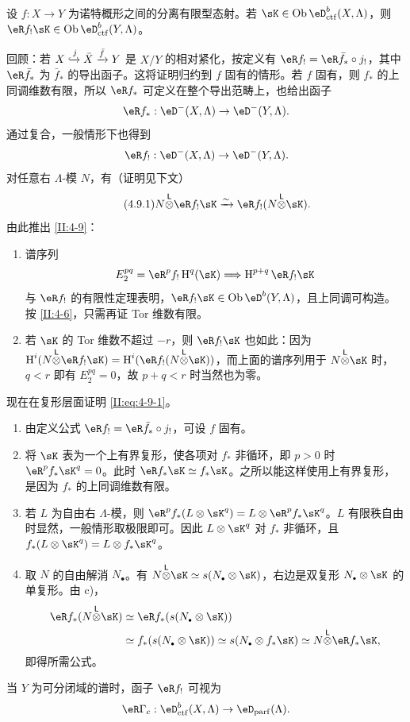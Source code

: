 \begin{theorem_}\label{II:4-9}
设 $f:X\to Y$ 为诺特概形之间的分离有限型态射。若 $\sK\in\ob\eD_{\mathrm{ctf}}^b(X,\Lambda)$，则 $\eR f_!\sK\in\ob\eD_{\mathrm{ctf}}^b(Y,\Lambda)$。
\end{theorem_}
回顾：若 $X\xhookrightarrow{j}\bar X\xrightarrow{\bar f}Y$ 是 $X/Y$ 的相对紧化，按定义有 $\eR f_!=\eR\bar f_*\circ j_!$，其中 $\eR\bar f_*$ 为 $\bar f_*$ 的导出函子。这将证明归约到 $f$ 固有的情形。若 $f$ 固有，则 $f_*$ 的上同调维数有限，所以 $\eR f_*$ 可定义在整个导出范畴上，也给出函子
\[\eR f_*:\eD^-(X,\Lambda)\to\eD^-(Y,\Lambda).\]
通过复合，一般情形下也得到
\[\eR f_!:\eD^-(X,\Lambda)\to\eD^-(Y,\Lambda).\]
对任意右 $\Lambda$-模 $N$，有（证明见下文）
\begin{equation*}\tag{4.9.1}\label{II:eq:4-9-1}
N\lotimes\eR f_!\sK\iso\eR f_!(N\lotimes\sK).
\end{equation*}
由此推出 \ref{II:4-9}：
\begin{enumerate}[\indent a)]
\item 谱序列
\[E_2^{pq}=\eR^pf_!\h^q(\sK)\Longrightarrow\h^{p+q}\eR f_!\sK\]
与 $\eR f_!$ 的有限性定理表明，$\eR f_!\sK\in\ob\eD^b(Y,\Lambda)$，且上同调可构造。按 \ref{II:4-6}，只需再证 Tor 维数有限。
\item 若 $\sK$ 的 Tor 维数不超过 $-r$，则 $\eR f_!\sK$ 也如此：因为 $\h^i(N\lotimes\eR f_!\sK)=\h^i(\eR f_!(N\lotimes\sK))$，而上面的谱序列用于 $N\lotimes\sK$ 时，$q<r$ 即有 $E_2^{pq}=0$，故 $p+q<r$ 时当然也为零。
\end{enumerate}
现在在复形层面证明 \eqref{II:eq:4-9-1}。
\begin{enumerate}[\indent a)]
\item 由定义公式 $\eR f_!=\eR\bar f_*\circ j_!$，可设 $f$ 固有。
\item 将 $\sK$ 表为一个上有界复形，使各项对 $f_*$ 非循环，即 $p>0$ 时 $\eR^pf_*\sK^q=0$。此时 $\eR f_*\sK\simeq f_*\sK$。之所以能这样使用上有界复形，是因为 $f_*$ 的上同调维数有限。
\item 若 $L$ 为自由右 $\Lambda$-模，则 $\eR^pf_*(L\otimes\sK^q)=L\otimes\eR^pf_*\sK^q$。$L$ 有限秩自由时显然，一般情形取极限即可。因此 $L\otimes\sK^q$ 对 $f_*$ 非循环，且 $f_*(L\otimes\sK^q)=L\otimes f_*\sK^q$。
\item 取 $N$ 的自由解消 $N_\bullet$。有 $N\lotimes\sK\simeq s(N_\bullet\otimes\sK)$，右边是双复形 $N_\bullet\otimes\sK$ 的单复形。由 c)，
\begin{align*}
\eR f_*(N\lotimes\sK)&\simeq\eR f_*(s(N_\bullet\otimes\sK))\\
&\simeq f_*(s(N_\bullet\otimes\sK))\simeq s(N_\bullet\otimes f_*\sK)\simeq N\lotimes\eR f_*\sK,
\end{align*}
即得所需公式。
\end{enumerate}
当 $Y$ 为可分闭域的谱时，函子 $\eR f_!$ 可视为
\[\eR\Gamma_c:\eD_{\mathrm{ctf}}^b(X,\Lambda)\to\eD_{\mathrm{parf}}(\Lambda).\]

